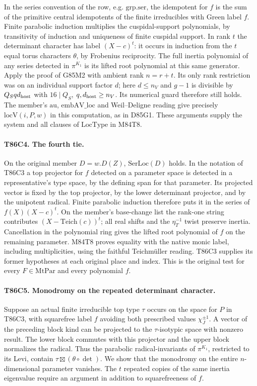 In the series convention of the row, e.g. $\mathrm{grp.ser}$,
the idempotent for $f$ is the sum of the primitive central idempotents
of the finite irreducibles with Green label $f$. Finite parabolic
induction multiplies the cuspidal-support polynomials, by transitivity
of induction and uniqueness of finite cuspidal support. In rank $t$
the determinant character has label $(X-c)^t$: it occurs in
induction from the $t$ equal torus characters $\theta$, by
Frobenius reciprocity. The full inertia polynomial of any series
detected in $\pi^{K_1}$ is its lifted root polynomial at this same
generator. Apply the proof of G85M2 with ambient rank $n=r+t$.
Its only rank restriction was on an individual support factor $d$;
here $d\le n_V$ and $g-1$ is divisible by $Q_S q d_{\rm host}$
with $16\mid Q_S$, $q,d_{\rm host}\ge n_V$. Its numerical guard
therefore still holds. The member's $\mathrm{au}$, $\mathrm{embAV\_loc}$
and Weil--Deligne reading give precisely $\mathrm{locV}(i,P,w)$
in this computation, as in D85G1. These arguments supply the system
and all clauses of $\mathrm{LocType}$ in M84T8.

\paragraph{T86C4. The fourth tie.}
On the original member $D=w.D(Z)$, $\mathrm{SerLoc}(D)$ holds.
In the notation of T86C3 a top projector for $f$ detected on a
parameter space is detected in a representative's type space,
by the defining span for that parameter. Its projected vector is
fixed by the top projector, by the lower determinant projector,
and by the unipotent radical. Finite parabolic induction therefore
puts it in the series of $f(X)(X-c)^t$. On the member's base-change
list the rank-one string contributes $(X-\mathrm{Teich}(c))^t$;
all real shifts and the $\eta_T^{-1}$ twist preserve inertia.
Cancellation in the polynomial ring gives the lifted root polynomial
of $f$ on the remaining parameter. M84T8 proves equality with the
native monic label, including multiplicities, using the faithful
Teichm\"uller reading. T86C3 supplies its former hypotheses at
each original place and index. This is the original test for every
$F\in\mathrm{MtPar}$ and every polynomial $f$.

\paragraph{T86C5. Monodromy on the repeated determinant character.}
Suppose an actual finite irreducible top type $\tau$ occurs on
the space for $P$ in T86C3, with squarefree label $f$ avoiding
both prescribed values $\chi_J^{\pm1}$. A vector of the preceding
block kind can be projected to the $\tau$-isotypic space with
nonzero result. The lower block commutes with this projector and
the upper block normalizes the radical. Thus the parabolic
radical-invariants of $\pi^{K_1}$, restricted to its Levi, contain
$\tau\boxtimes (\theta\circ\det)$.
We show that the monodromy on the entire $n$-dimensional
parameter vanishes. The $t$ repeated copies of the same inertia
eigenvalue require an argument in addition to squarefreeness of $f$.

